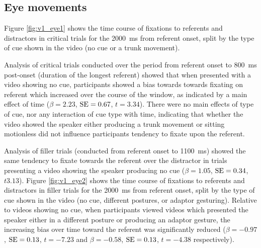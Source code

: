 \documentclass[a4paper,man,natbib]{apa6}
\newcommand{\resultsLM}[3]{$\beta = #1$, $\textnormal{SE} = #2$, $t #3$}
\begin{document}
\subsection{Eye movements}
Figure \ref{fig:v1_eye1} shows the time course of fixations to referents and distractors in critical trials for the 2000~ms from referent onset, split by the type of cue shown in the video (no cue or a trunk movement).

Analysis of critical trials conducted over the period from referent onset to 800~ms post-onset (duration of the longest referent) showed that when presented with a video showing no cue, participants showed a bias towards towards fixating on referent which increased over the course of the window, as indicated by a main effect of time (\resultsLM{2.23}{0.67}{=3.34}).
There were no main effects of type of cue, nor any interaction of cue type with time, indicating that whether the video showed the speaker either producing a trunk movement or sitting motionless did not influence participants tendency to fixate upon the referent.


Analysis of filler trials (conducted from referent onset to 1100~ms) showed the same tendency to fixate towards the referent over the distractor in trials presenting a video showing the speaker producing no cue (\resultsLM{1.05}{0.34}{3.13}).
Figure \ref{fig:v1_eye2} shows the time course of fixations to referents and distractors in filler trials for the 2000~ms from referent onset, split by the type of cue shown in the video (no cue, different postures, or adaptor gesturing).
Relative to videos showing no cue, when participants viewed videos which presented the speaker either in a different posture or producing an adaptor gesture, the increasing bias over time toward the referent was significantly reduced (\resultsLM{-0.97}{0.13}{=-7.23} and \resultsLM{-0.58}{0.13}{=-4.38} respectively).
\end{document}
